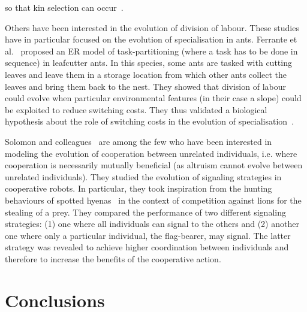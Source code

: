 so that kin selection can occur~\parencite{VanBaalen1998}. 

        Others have been interested in the evolution of division of labour. These studies have in particular focused on the evolution of specialisation in ants. Ferrante et al.~\parencite{Ferrante2015} proposed an ER model of task-partitioning (where a task has to be done in sequence) in leafcutter ants. In this species, some ants are tasked with cutting leaves and leave them in a storage location from which other ants collect the leaves and bring them back to the nest. They showed that division of labour could evolve when particular environmental features (in their case a slope) could be exploited to reduce switching costs. They thus validated a biological hypothesis about the role of switching costs in the evolution of specialisation~\parencite{Duarte2011}. 


        Solomon and colleagues~\parencite{Solomon2012} are among the few who have been interested in modeling the evolution of cooperation between unrelated individuals, i.e. where cooperation is necessarily mutually beneficial (as altruism cannot evolve between unrelated individuals). They studied the evolution of signaling strategies in cooperative robots. In particular, they took inspiration from the hunting behaviours of spotted hyenas~\parencite{Smith2012a} in the context of competition against lions for the stealing of a prey. They compared the performance of two different signaling strategies: (1) one where all individuals can signal to the others and (2) another one where only a particular individual, the flag-bearer, may signal. The latter strategy was revealed to achieve higher coordination between individuals and therefore to increase the benefits of the cooperative action.


\section{Conclusions}

